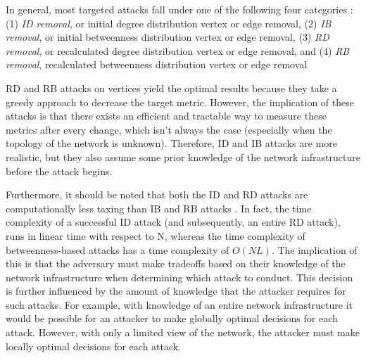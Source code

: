\documentclass[doc]{apa}%
\begin{document}
In general, most targeted attacks fall under one of the following four categories \cite{Attacks}: (1) \emph{ID removal}, or initial degree distribution vertex or edge removal, (2) \emph{IB removal}, or initial betweenness distribution vertex or edge removal, (3) \emph{RD removal}, or recalculated degree distribution vertex or edge removal, and (4) \emph{RB removal}, recalculated betweenness distribution vertex or edge removal

RD and RB attacks on vertices yield the optimal results because they take a greedy approach to decrease the target metric. However, the implication of these attacks is that there exists an efficient and tractable way to measure these metrics after every change, which isn't always the case (especially when the topology of the network is unknown). Therefore, ID and IB attacks are more realistic, but they also assume some prior knowledge of the network infrastructure before the attack begins. 

Furthermore, it should be noted that both the ID and RD attacks are computationally less taxing than IB and RB attacks \cite{Attacks}. In fact, the time complexity of a successful ID attack (and subsequently, an entire RD attack), runs in linear time with respect to N, whereas the time complexity of betweenness-based attacks has a time complexity of $O(NL)$. The implication of this is that the adversary must make tradeoffs based on their knowledge of the network infrastructure when determining which attack to conduct. This decision is further influenced by the amount of knowledge that the attacker requires for such attacks. For example, with knowledge of an entire network infrastructure it would be possible for an attacker to make globally optimal decisions for each attack. However, with only a limited view of the network, the attacker must make locally optimal decisions for each attack. 
\end{document}
